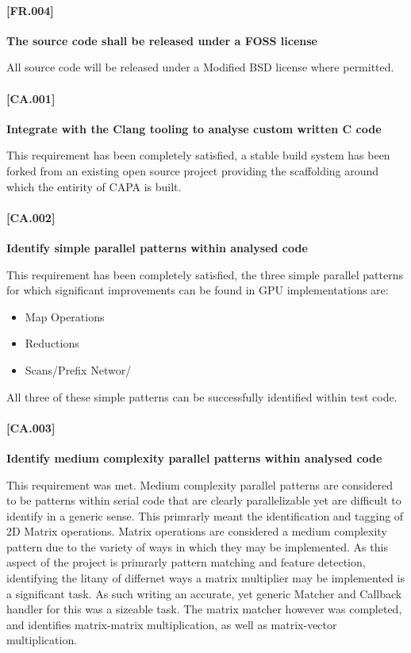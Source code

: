 \paragraph{[FR.004]}
\textbf{The source code shall be released under a FOSS license}

All source code will be released under a Modified BSD license where permitted.


\paragraph{[CA.001]}
\textbf{Integrate with the Clang tooling to analyse custom written C code}

This requirement has been completely satisfied, a stable build system has been forked from an
existing open source project providing the scaffolding around which the entirity of CAPA is built.

\paragraph{[CA.002]}
\textbf{Identify simple parallel patterns within analysed code}

This requirement has been completely satisfied, the three simple parallel patterns for which
significant improvements can be found in GPU implementations are:

\begin{itemize}
\item Map Operations
\item Reductions
\item Scans/Prefix Networ/
\end{itemize}

All three of these simple patterns can be successfully identified within test code.

\paragraph{[CA.003]}
\textbf{Identify medium complexity parallel patterns within analysed code}

This requirement was met. Medium complexity parallel patterns are considered to be patterns within serial code that are
clearly parallelizable yet are difficult to identify in a generic sense. This primrarly meant the
identification and tagging of 2D Matrix operations. Matrix operations are considered a medium
complexity pattern due to the variety of ways in which they may be implemented. As this aspect of
the project is primrarly pattern matching and feature detection, identifying the litany of differnet
ways a matrix multiplier may be implemented is a significant task. As such writing an accurate, yet
generic Matcher and Callback handler for this was a sizeable task. The matrix matcher however was
completed, and identifies matrix-matrix multiplication, as well as matrix-vector multiplication. 

